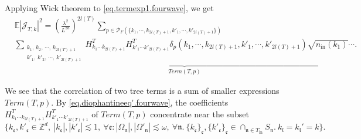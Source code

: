  Applying Wick theorem to \eqref{eq.termexp1.fourwave}, we get
 \begin{equation}\label{eq.termexp'.fourwave}
 \begin{split}
  &\mathbb{E}|\mathcal{J}_{T,k}|^2=\left(\frac{\lambda^2}{L^{2d}}\right)^{2l(T)}
  \sum_{p\in \mathcal{P}_F(\{k_1,\cdots, k_{2l(T)+1}, k'_1,\cdots, k'_{2l(T)+1}\})}
  \\[0.5em]
  & \underbrace{\sum_{\substack{k_1,\, k_2,\, \cdots,\, k_{2l(T)+1}\\k'_1,\, k'_2,\, \cdots,\, k'_{2l(T)+1}}}
  H^T_{k_1\cdots k_{2l(T)+1}} H^{T}_{k'_1\cdots k'_{2l(T)+1}} \delta_{p}(k_1,\cdots, k_{2l(T)+1}, k'_1,\cdots, k'_{2l(T)+1})\sqrt{n_{\textrm{in}}(k_1)}\cdots}_{Term(T, p)}.
 \end{split}
 \end{equation}
 
 We see that the correlation of two tree terms is a sum of smaller expressions $Term(T, p)$. By \eqref{eq.diophantineeq'.fourwave}, the coefficients $H^T_{k_1\cdots k_{2l(T)+1}} H^{T}_{k'_1\cdots k'_{2l(T)+1}}$ of $Term(T, p)$ concentrate near the subset 
 \begin{equation}\label{eq.diophantineequnpaired.fourwave}
  \{k_{\mathfrak{e}}, k'_{\mathfrak{e}}\in \mathbb{Z}^d,\ |k_{\mathfrak{e}}|, |k'_{\mathfrak{e}}|\lesssim 1,\ \forall \mathfrak{e}: |\Omega_{\mathfrak{n}}|,|\Omega'_{\mathfrak{n}}|\lesssim \omega,\ \forall \mathfrak{n}. \ \{k_{\mathfrak{e}}\}_{\mathfrak{e}}, \{k'_{\mathfrak{e}}\}_{\mathfrak{e}}\in \cap_{\mathfrak{n}\in T_{\text{in}}} S_{\mathfrak{n}}.\ k_{\mathfrak{l}}=k_{\mathfrak{l}}'=k\}.
 \end{equation}
 
